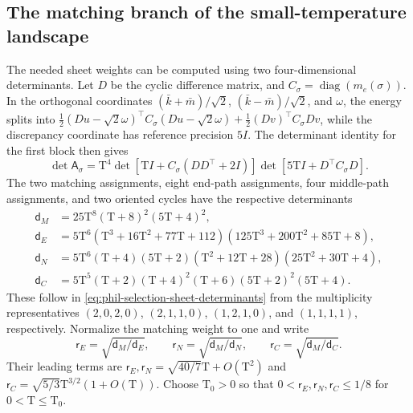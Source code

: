 \subsection*{The matching branch of the small-temperature landscape}

The needed sheet weights can be computed using two four-dimensional
determinants. Let \(D\) be the cyclic difference matrix, and
\(C_\sigma=\operatorname{diag}(m_e(\sigma))\). In the orthogonal
coordinates \((\bar k+\bar m)/\sqrt2\),
\((\bar k-\bar m)/\sqrt2\), and \(\omega\), the energy splits into
\(\frac12(Du-\sqrt2\omega)^\top C_\sigma(Du-\sqrt2\omega)
 +\frac12(Dv)^\top C_\sigma Dv\), while the discrepancy coordinate has
reference precision \(5I\). The determinant identity for the first block
then gives
\begin{equation}
 \det\mathsf A_\sigma
 =\mathrm T^4
  \det[\mathrm TI+C_\sigma(DD^\top+2I)]
  \det[5\mathrm TI+D^\top C_\sigma D].
\label{eq:phil-selection-sheet-determinants}
\end{equation}
The two matching assignments, eight end-path assignments, four middle-path
assignments, and two oriented cycles have the respective determinants
\[
 \begin{aligned}
 \mathsf d_M&=25\mathrm T^8(\mathrm T+8)^2(5\mathrm T+4)^2,\\
 \mathsf d_E&=5\mathrm T^6
   (\mathrm T^3+16\mathrm T^2+77\mathrm T+112)
   (125\mathrm T^3+200\mathrm T^2+85\mathrm T+8),\\
 \mathsf d_N&=5\mathrm T^6(\mathrm T+4)(5\mathrm T+2)
   (\mathrm T^2+12\mathrm T+28)(25\mathrm T^2+30\mathrm T+4),\\
 \mathsf d_C&=5\mathrm T^5(\mathrm T+2)(\mathrm T+4)^2(\mathrm T+6)
                                     (5\mathrm T+2)^2(5\mathrm T+4).
 \end{aligned}
\]
These follow in \cref{eq:phil-selection-sheet-determinants} from the
multiplicity representatives \((2,0,2,0)\), \((2,1,1,0)\),
\((1,2,1,0)\), and \((1,1,1,1)\), respectively.
Normalize the matching weight to one and write
\[
 \mathsf r_E=\sqrt{\mathsf d_M/\mathsf d_E},\qquad
 \mathsf r_N=\sqrt{\mathsf d_M/\mathsf d_N},\qquad
 \mathsf r_C=\sqrt{\mathsf d_M/\mathsf d_C}.
\]
Their leading terms are
\(\mathsf r_E,\mathsf r_N=\sqrt{40/7}\mathrm T+O(\mathrm T^2)\) and
\(\mathsf r_C=\sqrt{5/3}\mathrm T^{3/2}(1+O(\mathrm T))\).
Choose \(\mathrm T_0>0\) so that \(0<\mathsf r_E,\mathsf r_N,\mathsf r_C\le1/8\) for
\(0<\mathrm T\le\mathrm T_0\).

